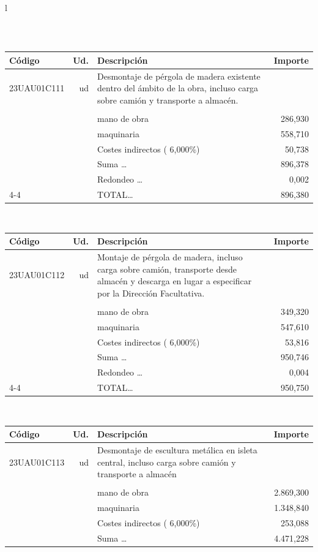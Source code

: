 \documentclass{book}%
\begin{document}
\begin{longtable}{l}
\begin{tabular}{l r p{60mm} r}
\end{tabular}\\%
\begin{tabular}{l r p{60mm} r}%
Código&Ud.&Descripción&Importe\\%
\hline%
23UAU01C111&ud&Desmontaje de pérgola de madera existente dentro del ámbito de la obra, incluso carga sobre camión y transporte a almacén.&\\%
&&&\\%
&&mano de obra&   286,930\\%
&&maquinaria&   558,710\\%
&&Costes indirectos (     6,000\%)&    50,738\\%
&&Suma \ldots&   896,378\\%
&&Redondeo \ldots&     0,002\\%
\cline{4-4}%
&&TOTAL\ldots&   896,380\\%
\end{tabular}\\%
\begin{tabular}{l r p{60mm} r}%
Código&Ud.&Descripción&Importe\\%
\hline%
23UAU01C112&ud&Montaje de pérgola de madera, incluso carga sobre camión, transporte desde almacén y descarga en lugar a especificar por la Dirección Facultativa.&\\%
&&&\\%
&&mano de obra&   349,320\\%
&&maquinaria&   547,610\\%
&&Costes indirectos (     6,000\%)&    53,816\\%
&&Suma \ldots&   950,746\\%
&&Redondeo \ldots&     0,004\\%
\cline{4-4}%
&&TOTAL\ldots&   950,750\\%
\end{tabular}\\%
\begin{tabular}{l r p{60mm} r}%
Código&Ud.&Descripción&Importe\\%
\hline%
23UAU01C113&ud&Desmontaje de escultura metálica en isleta central, incluso carga sobre camión y transporte a almacén&\\%
&&&\\%
&&mano de obra& 2.869,300\\%
&&maquinaria& 1.348,840\\%
&&Costes indirectos (     6,000\%)&   253,088\\%
&&Suma \ldots& 4.471,228\\%

\end{tabular}
\end{longtable}
\end{document}

